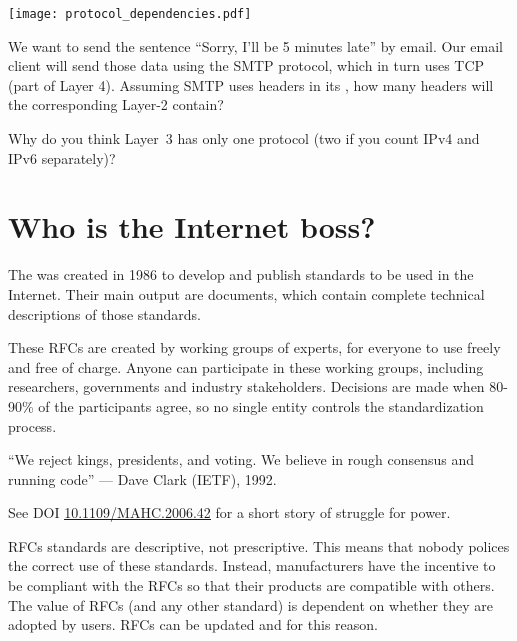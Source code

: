 \texttt{[image: protocol\_dependencies.pdf]}

\begin{exercise}
We want to send the sentence ``Sorry, I'll be 5 minutes late'' by email.
Our email client will send those data using the SMTP protocol, which in turn
uses TCP (part of Layer 4).
% 
Assuming SMTP uses headers in its , how many headers will 
the corresponding Layer-2  contain?
\end{exercise}

\begin{exercise}
Why do you think Layer~3 has only one protocol (two if you count IPv4 and IPv6 separately)? 
\end{exercise}

\section{Who is the Internet boss?}

The  was created in 1986
to develop and publish standards to be used in the Internet. 
% 
Their main output are   documents,
which contain complete technical descriptions of those standards.


These RFCs are created by working groups of experts, 
for everyone to use freely and free of charge. 
% 
Anyone can participate in these working groups, including researchers,
governments and industry stakeholders. 
% 
Decisions are made when 80-90\% of the participants agree, so no single 
entity controls the standardization process.
% 
\begin{remark}
``We reject kings, presidents, and voting. 
We believe in rough consensus and running code'' 
--- Dave Clark (IETF), 1992.

See DOI \href{https://dx.doi.org/10.1109/MAHC.2006.42}{\underline{10.1109/MAHC.2006.42}} for 
a short story of struggle for power.
\end{remark}

RFCs standards are descriptive, not prescriptive. This means that nobody polices the correct 
use of these standards. Instead, manufacturers have the incentive to be compliant with the RFCs 
so that their products are compatible with others. 
% 
The value of RFCs (and any other standard) is dependent on whether
they are adopted by users. RFCs can be updated and  for this reason.

